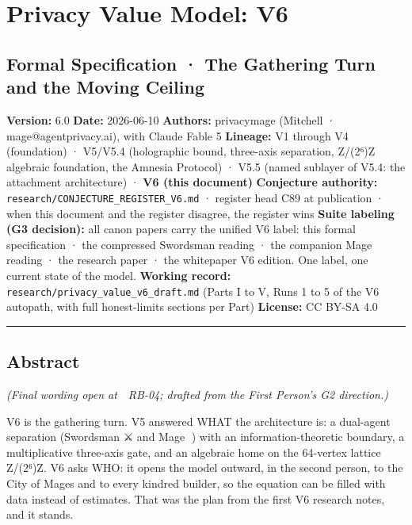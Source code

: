 \documentclass[
]{article}
\author{}
\date{}
\begin{document}
\section{Privacy Value Model: V6}\label{privacy-value-model-v6}

\subsection{Formal Specification · The Gathering Turn and the Moving
Ceiling}\label{formal-specification-the-gathering-turn-and-the-moving-ceiling}

\textbf{Version:} 6.0 \textbf{Date:} 2026-06-10 \textbf{Authors:}
privacymage (Mitchell · mage@agentprivacy.ai), with Claude Fable 5
\textbf{Lineage:} V1 through V4 (foundation) · V5/V5.4 (holographic
bound, three-axis separation, Z/(2⁶)Z algebraic foundation, the Amnesia
Protocol) · V5.5 (named sublayer of V5.4: the attachment architecture) ·
\textbf{V6 (this document)} \textbf{Conjecture authority:}
\texttt{research/CONJECTURE\_REGISTER\_V6.md} · register head C89 at
publication · when this document and the register disagree, the register
wins \textbf{Suite labeling (G3 decision):} all canon papers carry the
unified V6 label: this formal specification · the compressed Swordsman
reading · the companion Mage reading · the research paper · the
whitepaper V6 edition. One label, one current state of the model.
\textbf{Working record:} \texttt{research/privacy\_value\_v6\_draft.md}
(Parts I to V, Runs 1 to 5 of the V6 autopath, with full honest-limits
sections per Part) \textbf{License:} CC BY-SA 4.0

\begin{center}\rule{0.5\linewidth}{0.5pt}\end{center}

\subsection{Abstract}\label{abstract}

\emph{(Final wording open at 📖 RB-04; drafted from the First Person's
G2 direction.)}

V6 is the gathering turn. V5 answered WHAT the architecture is: a
dual-agent separation (Swordsman ⚔️ and Mage 🧙) with an
information-theoretic boundary, a multiplicative three-axis gate, and an
algebraic home on the 64-vertex lattice Z/(2⁶)Z. V6 asks WHO: it opens
the model outward, in the second person, to the City of Mages and to
every kindred builder, so the equation can be filled with data instead
of estimates. That was the plan from the first V6 research notes, and it
stands.
\end{document}
